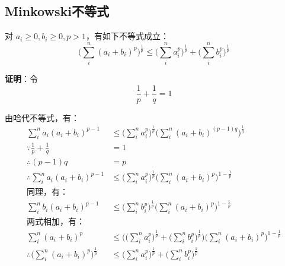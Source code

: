 \documentclass[12pt]{article}
\begin{document}
\subsection{Minkowski不等式}
\begin{mdframed}[
linecolor=black!40,outerlinewidth=1pt,roundcorner=.5em,innertopmargin=1ex,innerbottommargin=.5\baselineskip,innerrightmargin=1em,innerleftmargin=1em,backgroundcolor=gray!5,
]
对 $a_i \ge 0, b_i \ge 0, p > 1$，有如下不等式成立：
$$
\Big(\sum_i^n(a_i+b_i)^p \Big)^{\frac{1}{p}} \le \Big(\sum_i^na_i^p\Big)^{\frac{1}{p}} + \Big(\sum_i^nb_i^p\Big)^{\frac{1}{p}} 
$$
\end{mdframed}
\textbf{证明}：令 
$$
\frac{1}{p} + \frac{1}{q} = 1
$$

由哈代不等式，有：
\begin{align*}
\sum_i^na_i(a_i+b_i)^{p-1}&\le \Big(\sum_i^na_i^p\Big)^{\frac{1}{p}}\Big(\sum_i^n(a_i+b_i)^{(p-1)q}\Big)^{\frac{1}{q}} \\
%
\because \frac{1}{p} + \frac{1}{q} &= 1 \\
\therefore (p-1)q &= p \\
%
\therefore \sum_i^na_i(a_i+b_i)^{p-1} &\le \Big(\sum_i^na_i^p\Big)^{\frac{1}{p}}\Big(\sum_i^n(a_i+b_i)^p\Big)^{1-\frac{1}{p}} \\
\text{同理，有：} &\ \\
\sum_i^nb_i(a_i+b_i)^{p-1} &\le \Big(\sum_i^nb_i^p\Big)^{\frac{1}{p}}\Big(\sum_i^n(a_i+b_i)^p\Big)^{1-\frac{1}{p}} \\
\text{两式相加，有：} &\ \\
\sum_i^n(a_i+b_i)^{p} &\le 
\Bigg(\Big(\sum_i^na_i^p\Big)^{\frac{1}{p}} + \Big(\sum_i^nb_i^p\Big)^{\frac{1}{p}}\Bigg) \Big(\sum_i^n(a_i+b_i)^p\Big)^{1-\frac{1}{p}} \\
\therefore \Big(\sum_i^n(a_i+b_i)^{p}\Big)^{\frac{1}{p}} &\le \Big(\sum_i^na_i^p\Big)^{\frac{1}{p}} + \Big(\sum_i^nb_i^p\Big)^{\frac{1}{p}}
\end{align*}
\end{document}
